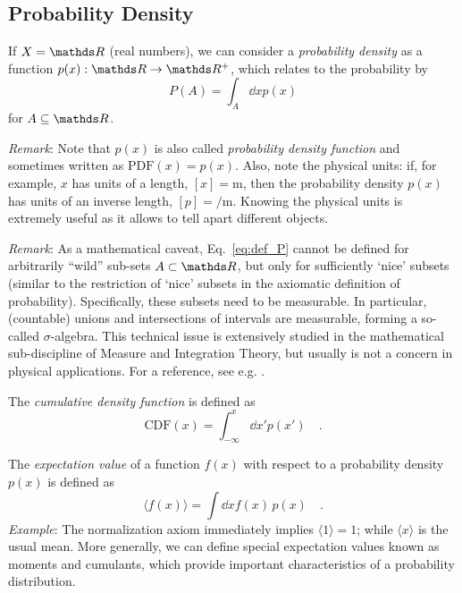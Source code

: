 \documentclass{notebook}
\makeatletter
\newcommand{\Remark}{\textit{Remark}} %
\newcommand{\Example}{\textit{Example}}
\makeatother
\begin{document}
\subsection*{Probability Density}

If $X = \R$ (real numbers), we can consider a \textit{probability density} 
as a function $p(x) : \R \to \R^+$, which relates to the probability by
%
\begin{equation}
\label{eq:def_P}
P(A) = \int_A{\dd{x} p(x)}
\end{equation}
%
for $A \subseteq \R$. 

\Remark: Note that $p(x)$ is also called \textit{probability density function} 
and sometimes written as $\mathrm{PDF}(x) = p(x)$. 
Also, note the physical units: 
if, for example, $x$ has units of a length, $[x] = \si{\meter}$, 
then the probability density $p(x)$ has units of an inverse length, $[p] = \si{\per \meter}$. 
Knowing the physical units is extremely useful as it allows to tell apart different objects.

\Remark: As a mathematical caveat, Eq.~\eqref{eq:def_P} cannot be defined for arbitrarily ``wild'' sub-sets $A \subset \R$, but only for sufficiently `nice' subsets (similar to the restriction of `nice' subsets in the axiomatic definition of probability). 
Specifically, these subsets need to be measurable. 
In particular, (countable) unions and intersections of intervals are measurable, 
forming a so-called $\sigma$-algebra. 
This technical issue is extensively studied in the mathematical sub-discipline of Measure and Integration Theory, but usually is not a concern in physical applications.
For a reference, see e.g. \cite{Billingsley2012}.

The \textit{cumulative density function} is defined as
\begin{equation}
\mathrm{CDF}(x) = \int^x_{-\infty}{\dd{x'} p(x')} \quad.
\end{equation}

The \textit{expectation value} of a function $f(x)$ with respect to a probability density $p(x)$ is defined as
\begin{equation}
\langle f(x) \rangle = \int \dd{x} f(x)\,p(x) \quad.
\end{equation}
\Example: The normalization axiom immediately implies $\langle 1 \rangle = 1$; 
while $\langle x\rangle$ is the usual mean.
More generally, we can define special expectation values known as
moments and cumulants, which provide important characteristics of a probability distribution. 
\end{document}
